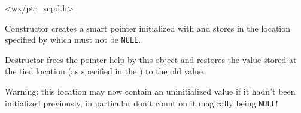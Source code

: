 

<wx/ptr\_scpd.h>


\label{wxscopedtiedptrctor}


Constructor creates a smart pointer initialized with  and stores 
 in the location specified by  which must not be 
{\tt NULL}.

\label{wxscopedtiedptrdtor}


Destructor frees the pointer help by this object and restores the value stored
at the tied location (as specified in the )
to the old value.

Warning: this location may now contain an uninitialized value if it hadn't been
initialized previously, in particular don't count on it magically being 
{\tt NULL}!


